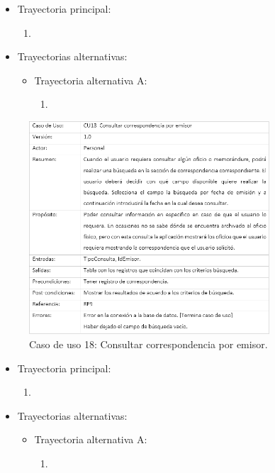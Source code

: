 \begin{itemize}
	\item Trayectoria principal:
	\begin{enumerate}
		\item 
	\end{enumerate}
	
	\item Trayectorias alternativas:
	\begin{itemize}
		\item Trayectoria alternativa A:
			\begin{enumerate}
				\item 
			\end{enumerate}
	\end{itemize}
\end{itemize}


\begin{figure}[htbp!]
		\centering
			\includegraphics[width=0.8\textwidth]{images/CU/CU18}
		\caption{Caso de uso 18: Consultar correspondencia por emisor.}
		\label{Tabla}
	\end{figure}
	
\begin{itemize}
	\item Trayectoria principal:
	\begin{enumerate}
		\item 
	\end{enumerate}
	
	\item Trayectorias alternativas:
	\begin{itemize}
		\item Trayectoria alternativa A:
			\begin{enumerate}
				\item 
			\end{enumerate}
	\end{itemize}
\end{itemize}

